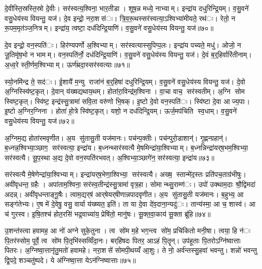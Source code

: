 दे॒वीस्ति॒स्रस्ति॒स्रो दे॒वीः। सर॑स्वत्य॒श्विना॒ भार॒तीडा। शूष॒न्न मध्ये॒ नाभ्याम्। इन्द्रा॑य दधुरिन्द्रि॒यम्। व॒सु॒वने॑ वसु॒धेय॑स्य वियन्तु॒ यज॑। दे॒व इन्द्रो॒ नरा॒शस॑ः। त्रि॒व॒रू॒थस्सर॑स्वत्या॒ऽश्विभ्या॑मीयते॒ रथ॑ः। रेतो॒ न रू॒पम॒मृत॑ञ्ज॒नित्रम्। इन्द्रा॑य॒ त्वष्टा॒ दध॑दिन्द्रि॒याणि॑। व॒सु॒वने॑ वसु॒धेय॑स्य वियन्तु॒ यज॑॥७०॥

दे॒व इन्द्रो॒ वन॒स्पति॑ः। हिर॑ण्यपर्णो अ॒श्विभ्याम्। सर॑स्वत्यास्सुपिप्प॒लः। इन्द्रा॑य पच्यते॒ मधु॑। ओजो॒ न जू॒तिमृ॑ष॒भो न भामम्। वन॒स्पति॑र्नो॒ दध॑दिन्द्रि॒याणि॑। व॒सु॒वने॑ वसु॒धेय॑स्य वियन्तु॒ यज॑। दे॒वं ब॒र्॒हिर्वारि॑तीनाम्। अ॒ध्व॒रे स्ती॒र्णम॒श्विभ्याम्। ऊर्ण॑म्रदा॒स्सर॑स्वत्याः॥७१॥

स्यो॒नमि॑न्द्र ते॒ सद॑ः। ई॒शायै॑ म॒न्यु राजा॑नं ब॒र्॒हिषा॑ दधुरिन्द्रि॒यम्। व॒सु॒वने॑ वसु॒धेय॑स्य वियन्तु॒ यज॑। दे॒वो अ॒ग्निस्स्वि॑ष्ट॒कृत्। दे॒वान् य॑ख्षद्यथाय॒थम्। होता॑रा॒विन्द्र॑म॒श्विना। वा॒चा वाच॒ सर॑स्वतीम्। अ॒ग्नि सोम स्विष्ट॒कृत्। स्वि॑ष्ट॒ इन्द्र॑स्सु॒त्रामा॑ सवि॒ता वरु॑णो भि॒षक्। इ॒ष्टो दे॒वो वन॒स्पति॑ः। स्वि॑ष्टा दे॒वा आज्य॒पाः। इ॒ष्टो अ॒ग्निर॒ग्निना। होता॑ हो॒त्रे स्वि॑ष्ट॒कृत्। यशो॒ न दध॑दिन्द्रि॒यम्। ऊर्ज॒मप॑चिति स्व॒धाम्। व॒सु॒वने॑ वसु॒धेय॑स्य वियन्तु॒ यज॑॥७२॥


अ॒ग्निम॒द्य होता॑रमवृणीत। अ॒य सु॑तासु॒ती यज॑मानः। पच॑न्प॒क्तीः। पच॑न्पुरो॒डाशान्॑। गृ॒ह्णन्ग्रहान्॑। ब॒ध्नन्न॒श्विभ्या॒ञ्छाग॒ सर॑स्वत्या॒ इन्द्रा॑य। ब॒ध्नन्थ्सर॑स्वत्यै मे॒षमिन्द्रा॑या॒श्विभ्याम्। ब॒ध्नन्निन्द्रा॑यर्‌ष॒भम॒श्विभ्या॒ सर॑स्वत्यै। सू॒प॒स्था अ॒द्य दे॒वो वन॒स्पति॑रभवत्। अ॒श्विभ्या॒ञ्छागे॑न॒ सर॑स्वत्या॒ इन्द्रा॑य॥७३॥

सर॑स्वत्यै मे॒षेणेन्द्रा॑या॒श्विभ्याम्। इन्द्रा॑यर्‌ष॒भेणा॒श्विभ्या॒ सर॑स्वत्यै। अख्ष॒ स्तान्मे॑द॒स्तः प्रति॑पच॒ताग्र॑भीषुः। अवी॑वृधन्त॒ ग्रहैः। अपा॑ताम॒श्विना॒ सर॑स्व॒तीन्द्र॑स्सु॒त्रामा॑ वृत्र॒हा। सोमान्थ्सु॒राम्ण॑ः। उपो॑ उक्थाम॒दाः श्रौ॒द्विमदा॑ अदन्न्। अवी॑वृधन्ताङ्गू॒षैः। त्वाम॒द्यर्‌ष॑ आर्‌षेयर्‌षीणान्नपादवृणीत। अ॒य सु॑तासु॒ती यज॑मानः। ब॒हुभ्य॒ आ सङ्ग॑तेभ्यः। ए॒ष मे॑ दे॒वेषु॒ वसु॒ वार्या य॑ख्ष्यत॒ इति॑। ता या दे॒वा दे॑व॒दाना॒न्यदु॑ः। तान्य॑स्मा॒ आ च॒ शास्व॑। आ च॑ गुरस्व। इ॒षि॒तश्च॑ होत॒रसि॑ भद्र॒वाच्या॑य॒ प्रेषि॑तो॒ मानु॑षः। सू॒क्त॒वा॒काय॑ सू॒क्ता ब्रू॑हि॥७४॥


उ॒शन्त॑स्त्वा हवामह॒ आ नो॑ अग्ने सुके॒तुना। त्व सो॑म म॒हे भग॒न्त्व सो॑म॒ प्रचि॑कितो मनी॒षा। त्वया॒ हि न॑ः पि॒तर॑स्सोम॒ पूर्वे॒ त्व सो॑म पि॒तृभि॑स्सव्विँदा॒नः। बर्‌हि॑षदः पितर॒ आऽहं पि॒तॄन्। उप॑हूताः पि॒तरोऽग्नि॑ष्वात्ताः पितरः। अ॒ग्निष्वा॒त्तानृ॑तु॒मतो॑ हवामहे। नरा॒शसे॑ सोमपी॒थय्यँ आ॒शुः। ते नो॒ अर्व॑न्तस्सु॒हवा॑ भवन्तु। शन्नो॑ भवन्तु द्वि॒पदे॒ शञ्चतु॑ष्पदे। ये अ॑ग्निष्वा॒त्ता येऽन॑ग्निष्वात्ताः॥७५॥

